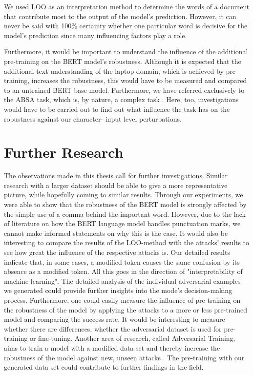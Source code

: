 We used LOO as an interpretation method to determine the words of a document that contribute most to the output of the model's prediction. However, it can never be said with 100\% certainty whether one particular word is decisive for the model's prediction since many influencing factors play a role.

Furthermore, it would be important to understand the influence of the additional pre-training on the BERT model's robustness. Although it is expected that the additional text understanding of the laptop domain, which is achieved by pre-training, increases the robustness, this would have to be measured and compared to an untrained BERT base model. 
Furthermore, we have referred exclusively to the ABSA task, which is, by nature, a complex task \cite{pavlopoulos2014aspect}. Here, too, investigations would have to be carried out to find out what influence the task has on the robustness against our character- input level perturbations.
\pagebreak

\section{Further Research}
The observations made in this thesis call for further investigations. 
Similar research with a larger dataset should be able to give a more representative picture, while hopefully coming to similar results. 
Through our experiments, we were able to show that the robustness of the BERT model is strongly affected by the simple use of a comma behind the important word. However, due to the lack of literature on how the BERT language model handles punctuation marks, we cannot make informed statements on why this is the case. It would also be interesting to compare the results of the LOO-method with the attacks' results to see how great the influence of the respective attacks is. Our detailed results indicate that, in some cases, a modified token causes the same confusion by its absence as a modified token. All this goes in the direction of "interpretability of machine learning". The detailed analysis of the individual adversarial examples we generated could provide further insights into the mode's decision-making process.
Furthermore, one could easily measure the influence of pre-training on the robustness of the model by applying the attacks to a more or less pre-trained model and comparing the success rate. It would be interesting to measure whether there are differences, whether the adversarial dataset is used for pre-training or fine-tuning. Another area of research, called Adversarial Training, aims to train a model with a modified data set and thereby increase the robustness of the model against new, unseen attacks \cite{tramer2017ensemble}. The pre-training with our generated data set could contribute to further findings in the field. 
\pagebreak
